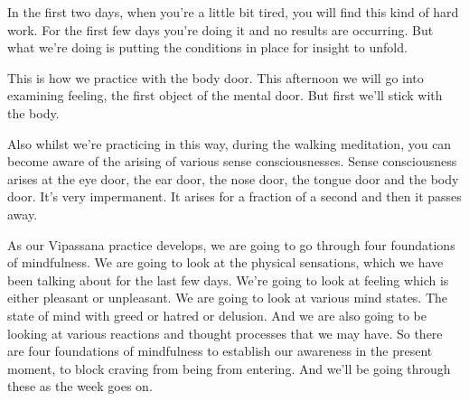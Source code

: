 \documentclass[letterpaper,10pt,english]{sphinxmanual}
\begin{document}
\sphinxAtStartPar
In the first two days, when you’re a little bit tired, you will find this
kind of hard work. For the first few days you’re doing it and no results are
occurring. But what we’re doing is putting the conditions in place for insight
to unfold.

\sphinxAtStartPar
This  is  how  we  practice  with  the  body  door. This  afternoon  we  will
go into examining feeling, the first object of the mental door. But first we’ll
stick with the body.

\sphinxAtStartPar
Also  whilst  we’re  practicing  in  this  way,  during  the  walking  meditation, you can become aware of the arising of various sense consciousnesses.
Sense consciousness arises at the eye door, the ear door, the nose door, the
tongue door and the body door. It’s very impermanent. It arises for a fraction
of a second and then it passes away.

\sphinxAtStartPar
As our Vipassana practice develops, we are going to go through four
foundations of mindfulness. We are going to look at the physical sensations,
which we have been talking about for the last few days. We’re going to look
at  feeling  which  is  either  pleasant  or  unpleasant.  We  are  going  to  look  at
various mind states. The state of mind with greed or hatred or delusion. And
we are also going to be looking at various reactions and thought processes
that we may have. So there are four foundations of mindfulness to establish
our  awareness  in  the  present  moment,  to  block  craving  from  being  from
entering. And we’ll be going through these as the week goes on.
\end{document}
